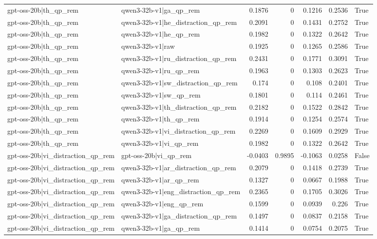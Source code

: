 \begin{table}
\begin{tabular}{l l r r r r l}
gpt-oss-20b|th_qp_rem & qwen3-32b-v1|ga_qp_rem & 0.1876 & 0 & 0.1216 & 0.2536 & True \\
gpt-oss-20b|th_qp_rem & qwen3-32b-v1|he_distraction_qp_rem & 0.2091 & 0 & 0.1431 & 0.2752 & True \\
gpt-oss-20b|th_qp_rem & qwen3-32b-v1|he_qp_rem & 0.1982 & 0 & 0.1322 & 0.2642 & True \\
gpt-oss-20b|th_qp_rem & qwen3-32b-v1|raw & 0.1925 & 0 & 0.1265 & 0.2586 & True \\
gpt-oss-20b|th_qp_rem & qwen3-32b-v1|ru_distraction_qp_rem & 0.2431 & 0 & 0.1771 & 0.3091 & True \\
gpt-oss-20b|th_qp_rem & qwen3-32b-v1|ru_qp_rem & 0.1963 & 0 & 0.1303 & 0.2623 & True \\
gpt-oss-20b|th_qp_rem & qwen3-32b-v1|sw_distraction_qp_rem & 0.174 & 0 & 0.108 & 0.2401 & True \\
gpt-oss-20b|th_qp_rem & qwen3-32b-v1|sw_qp_rem & 0.1801 & 0 & 0.114 & 0.2461 & True \\
gpt-oss-20b|th_qp_rem & qwen3-32b-v1|th_distraction_qp_rem & 0.2182 & 0 & 0.1522 & 0.2842 & True \\
gpt-oss-20b|th_qp_rem & qwen3-32b-v1|th_qp_rem & 0.1914 & 0 & 0.1254 & 0.2574 & True \\
gpt-oss-20b|th_qp_rem & qwen3-32b-v1|vi_distraction_qp_rem & 0.2269 & 0 & 0.1609 & 0.2929 & True \\
gpt-oss-20b|th_qp_rem & qwen3-32b-v1|vi_qp_rem & 0.1982 & 0 & 0.1322 & 0.2642 & True \\
gpt-oss-20b|vi_distraction_qp_rem & gpt-oss-20b|vi_qp_rem & -0.0403 & 0.9895 & -0.1063 & 0.0258 & False \\
gpt-oss-20b|vi_distraction_qp_rem & qwen3-32b-v1|ar_distraction_qp_rem & 0.2079 & 0 & 0.1418 & 0.2739 & True \\
gpt-oss-20b|vi_distraction_qp_rem & qwen3-32b-v1|ar_qp_rem & 0.1327 & 0 & 0.0667 & 0.1988 & True \\
gpt-oss-20b|vi_distraction_qp_rem & qwen3-32b-v1|eng_distraction_qp_rem & 0.2365 & 0 & 0.1705 & 0.3026 & True \\
gpt-oss-20b|vi_distraction_qp_rem & qwen3-32b-v1|eng_qp_rem & 0.1599 & 0 & 0.0939 & 0.226 & True \\
gpt-oss-20b|vi_distraction_qp_rem & qwen3-32b-v1|ga_distraction_qp_rem & 0.1497 & 0 & 0.0837 & 0.2158 & True \\
gpt-oss-20b|vi_distraction_qp_rem & qwen3-32b-v1|ga_qp_rem & 0.1414 & 0 & 0.0754 & 0.2075 & True \\

\end{tabular}
\end{table}
